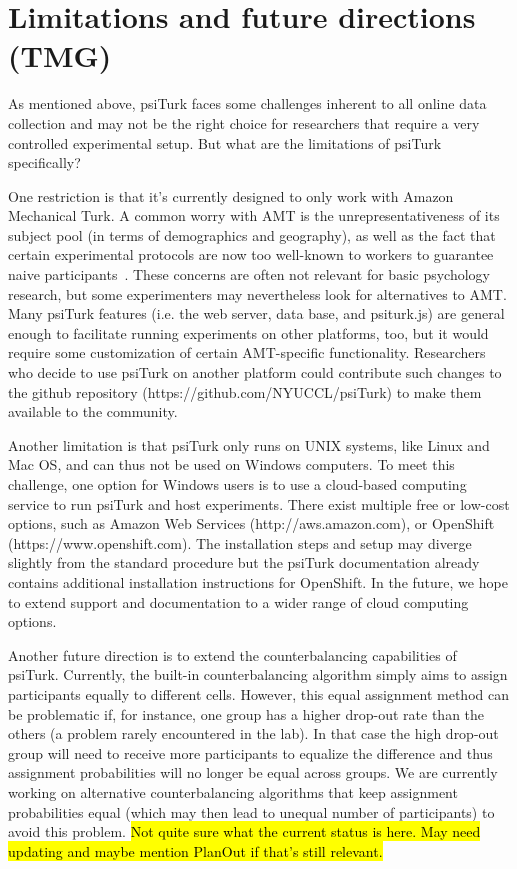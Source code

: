\documentclass[twocolumn]{svjour3}          %
\begin{document}
\section{Limitations and future directions (TMG)}

As mentioned above, psiTurk faces some challenges inherent to all online data collection and may not be the right choice for
researchers that require a very controlled experimental setup. But what are the limitations of psiTurk specifically?

One restriction is that it's currently designed to only work with Amazon Mechanical Turk. A common worry with AMT is the unrepresentativeness of
its subject pool (in terms of demographics and geography), as well as the fact that certain experimental protocols are now too well-known 
to workers to guarantee naive
participants~\citep{chandler2014nonnaivete}. These concerns are often not relevant for basic psychology research, but some experimenters may nevertheless
look for alternatives to AMT. Many psiTurk features (i.e. the web server, data base, and psiturk.js) are general
enough to facilitate running experiments on other platforms, too, but it would require some customization of certain AMT-specific functionality. 
Researchers who decide
to use psiTurk on another platform could contribute such changes to the github repository (https://github.com/NYUCCL/psiTurk) to make them
available to the community.


Another limitation is that psiTurk only runs on UNIX systems, like Linux and Mac OS, and can thus not be used on Windows computers. To meet this 
challenge, one option for Windows users is to use a cloud-based computing service to run psiTurk and host experiments. There exist
multiple free or low-cost options, such as Amazon Web Services (http://aws.amazon.com), or OpenShift (https://www.openshift.com). 
The installation steps and setup may diverge slightly from the standard procedure but 
 the psiTurk documentation already contains additional installation instructions for OpenShift. In the future, we hope to extend support  and 
documentation to a wider range of cloud computing options.

Another future direction is to extend the counterbalancing capabilities of psiTurk. Currently, the built-in counterbalancing algorithm
simply aims to assign participants equally to different cells.  However, this equal assignment method can be problematic if, for instance, 
one group has a higher drop-out rate than the others (a problem rarely encountered in the lab). 
In that case the high drop-out group will need to receive
more participants to equalize the difference and thus assignment probabilities will no longer be equal across groups. We are
currently working on alternative counterbalancing algorithms that keep assignment probabilities equal (which may then lead to unequal
number of participants) to avoid this problem. \hl{Not quite sure what the current status is here. May need updating and maybe mention PlanOut
if that's still relevant.}
\end{document}
